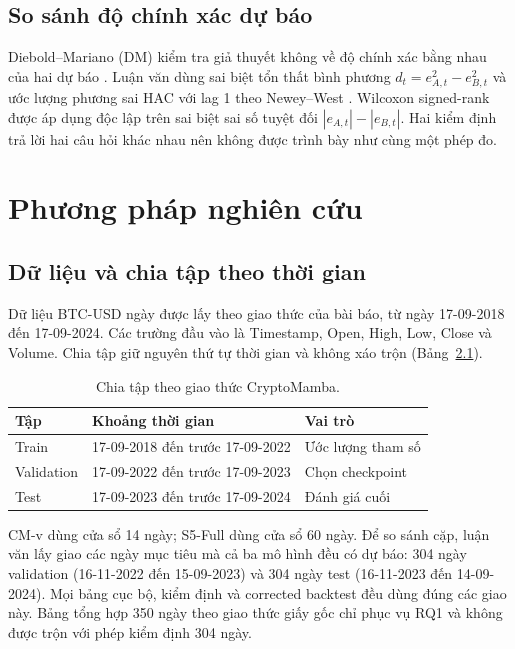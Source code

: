 \documentclass[13pt,a4paper,oneside]{report}
\begin{document}
\section{So sánh độ chính xác dự báo}\label{sec:stats-background}
Diebold--Mariano (DM) kiểm tra giả thuyết không về độ chính xác bằng nhau của hai dự báo
\cite{dm}. Luận văn dùng sai biệt tổn thất bình phương
$d_t=e_{A,t}^{2}-e_{B,t}^{2}$ và ước lượng phương sai HAC với lag 1 theo Newey--West
\cite{neweywest}. Wilcoxon signed-rank \cite{wilcoxon} được áp dụng độc lập trên sai biệt sai số
tuyệt đối $|e_{A,t}|-|e_{B,t}|$. Hai kiểm định trả lời hai câu hỏi khác nhau nên không được trình
bày như cùng một phép đo.

\chapter{Phương pháp nghiên cứu}\label{chap:method}

\section{Dữ liệu và chia tập theo thời gian}\label{sec:data}
Dữ liệu BTC-USD ngày được lấy theo giao thức của bài báo, từ ngày 17-09-2018 đến 17-09-2024. Các
trường đầu vào là Timestamp, Open, High, Low, Close và Volume. Chia tập giữ nguyên thứ tự thời gian
và không xáo trộn (Bảng~\ref{tab:splits}).

\begin{table}[htbp]
\centering
\caption{Chia tập theo giao thức CryptoMamba.}
\label{tab:splits}
\begin{tabularx}{\linewidth}{@{}lXX@{}}
\toprule
\textbf{Tập} & \textbf{Khoảng thời gian} & \textbf{Vai trò} \\
\midrule
Train & 17-09-2018 đến trước 17-09-2022 & Ước lượng tham số \\
Validation & 17-09-2022 đến trước 17-09-2023 & Chọn checkpoint \\
Test & 17-09-2023 đến trước 17-09-2024 & Đánh giá cuối \\
\bottomrule
\end{tabularx}
\end{table}

CM-v dùng cửa sổ 14 ngày; S5-Full dùng cửa sổ 60 ngày. Để so sánh cặp, luận văn lấy giao các ngày
mục tiêu mà cả ba mô hình đều có dự báo: 304 ngày validation (16-11-2022 đến 15-09-2023) và 304
ngày test (16-11-2023 đến 14-09-2024). Mọi bảng cục bộ, kiểm định và corrected backtest đều dùng
đúng các giao này. Bảng tổng hợp 350 ngày theo giao thức giấy gốc chỉ phục vụ RQ1 và không được trộn
với phép kiểm định 304 ngày.
\end{document}
